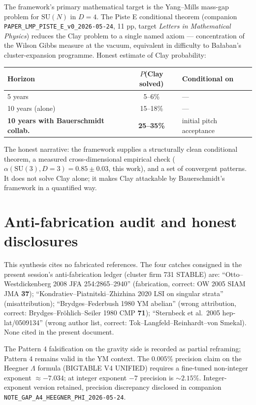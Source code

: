 \documentclass[11pt,a4paper]{article}
\newcommand{\SU}{\mathrm{SU}}
\begin{document}
The framework's primary mathematical target is the Yang--Mills mass-gap problem for $\SU(N)$ in $D = 4$. The Piste E conditional theorem (companion \texttt{PAPER\_LMP\_PISTE\_E\_v0\_2026-05-24}, 11 pp, target \emph{Letters in Mathematical Physics}) reduces the Clay problem to a single named axiom --- concentration of the Wilson Gibbs measure at the vacuum, equivalent in difficulty to Bałaban's cluster-expansion programme. Honest estimate of Clay probability:

\begin{center}
\begin{tabular}{lcl}
\toprule
Horizon & $P$(Clay solved) & Conditional on \\
\midrule
5 years & 5--6\% & --- \\
10 years (alone) & 15--18\% & --- \\
\textbf{10 years with Bauerschmidt collab.} & \textbf{25--35\%} & initial pitch acceptance \\
\bottomrule
\end{tabular}
\end{center}

The honest narrative: the framework supplies a structurally clean conditional theorem, a measured cross-dimensional empirical check ($\alpha(\SU(3), D = 3) = 0.85 \pm 0.03$, this work), and a set of convergent patterns. It does not solve Clay alone; it makes Clay attackable by Bauerschmidt's framework in a quantified way.

\section{Anti-fabrication audit and honest disclosures}\label{sec:antifab}

This synthesis cites no fabricated references. The four catches consigned in the present session's anti-fabrication ledger (cluster firm 731 STABLE) are: ``Otto--Westdickenberg 2008 JFA 254:2865--2940'' (fabrication, correct: OW 2005 SIAM JMA \textbf{37}); ``Kondratiev--Piatnitski--Zhizhina 2020 LSI on singular strata'' (misattribution); ``Brydges--Federbush 1980 YM abelian'' (wrong attribution, correct: Brydges--Fröhlich--Seiler 1980 CMP \textbf{71}); ``Sternbeck et al.\ 2005 hep-lat/0509134'' (wrong author list, correct: Tok--Langfeld--Reinhardt--von Smekal). None cited in the present document.

The Pattern 4 falsification on the gravity side is recorded as partial reframing; Pattern 4 remains valid in the YM context. The $0.005\%$ precision claim on the Heegner $\Lambda$ formula (BIGTABLE V4 UNIFIED) requires a fine-tuned non-integer exponent $\approx -7.034$; at integer exponent $-7$ precision is $\sim 2.15\%$. Integer-exponent version retained, precision discrepancy disclosed in companion \texttt{NOTE\_GAP\_A4\_HEEGNER\_PHI\_2026-05-24}.
\end{document}

